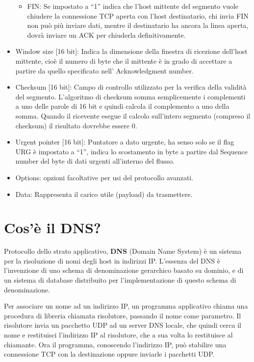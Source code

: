 \begin{itemize}
\begin{itemize}
\item	FIN: Se impostato a “1” indica che l’host mittente del segmento vuole chiudere la connessione TCP aperta con l’host destinatario, chi invia FIN non può più inviare dati, mentre il destinatario ha ancora la linea aperta, dovrà inviare un ACK per chiuderla definitivamente.
\end{itemize}
\item	Window size [16 bit]: Indica la dimensione della finestra di ricezione dell’host mittente, cioè il numero di byte che il mittente è in grado di accettare a partire da quello specificato nell’ Acknowledgment number.
\item	Checksum [16 bit]: Campo di controllo utilizzato per la verifica della validità del segmento. L’algoritmo di checksum somma semplicemente i complementi a uno delle parole di 16 bit e quindi calcola il complemento a uno della somma. Quando il ricevente esegue il calcolo sull’intero segmento (compreso il checksum) il risultato dovrebbe essere 0.
\item	Urgent pointer [16 bit]: Puntatore a dato urgente, ha senso solo se il flag URG è impostato a “1”, indica lo scostamento in byte a partire dal Sequence number del byte di dati urgenti all’interno del flusso.
\item	Options: opzioni facoltative per usi del protocollo avanzati.
\item	Data: Rappresenta il carico utile (payload) da trasmettere.
\end{itemize}

\section{Cos’è il DNS?}

Protocollo dello strato applicativo, \textbf{DNS} (Domain Name System) è un sistema per la risoluzione di nomi degli host in indirizzi IP. 
L’essenza del DNS è l’invenzione di uno schema di denominazione gerarchico basato su dominio, e di un sistema di database distribuito per l’implementazione di questo schema di denominazione.

Per associare un nome ad un indirizzo IP, un programma applicativo chiama una procedura di libreria chiamata risolutore, passando il nome come parametro. Il risolutore invia un pacchetto UDP ad un server DNS locale, che quindi cerca il nome e restituisci l’indirizzo IP al risolutore, che a sua volta lo restituisce al chiamante. Ora il programma, conoscendo l’indirizzo IP, può stabilire una connessione TCP con la destinazione oppure inviarle i pacchetti UDP.

